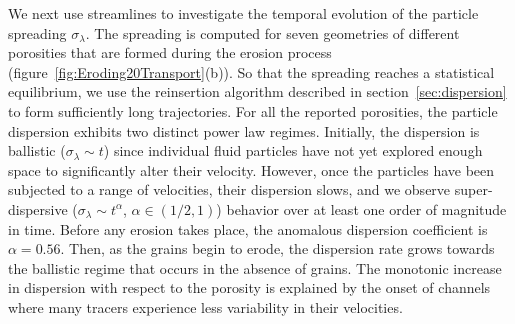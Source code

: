 \documentclass{jfm}
\begin{document}
We next use streamlines to investigate the temporal evolution of the
particle spreading $\sigma_\lambda$.  The spreading is computed for
seven geometries of different porosities that are formed during the
erosion process (figure~\ref{fig:Eroding20Transport}(b)).  So that the
spreading reaches a statistical equilibrium, we use the reinsertion
algorithm described in section~\ref{sec:dispersion} to form sufficiently
long trajectories.  For all the reported porosities, the particle
dispersion exhibits two distinct power law regimes.  Initially, the
dispersion is ballistic ($\sigma_\lambda \sim t$) since individual fluid
particles have not yet explored enough space to significantly alter
their velocity.  However, once the particles have been subjected to a
range of velocities, their dispersion slows, and we observe
super-dispersive ($\sigma_\lambda \sim t^\alpha$, $\alpha \in (1/2,1)$)
behavior over at least one order of magnitude in time.  Before any
erosion takes place, the anomalous dispersion coefficient is $\alpha =
0.56$.  Then, as the grains begin to erode, the dispersion rate grows
towards the ballistic regime that occurs in the absence of grains.  The
monotonic increase in dispersion with respect to the porosity is
explained by the onset of channels where many tracers experience less
variability in their velocities.
\end{document}
